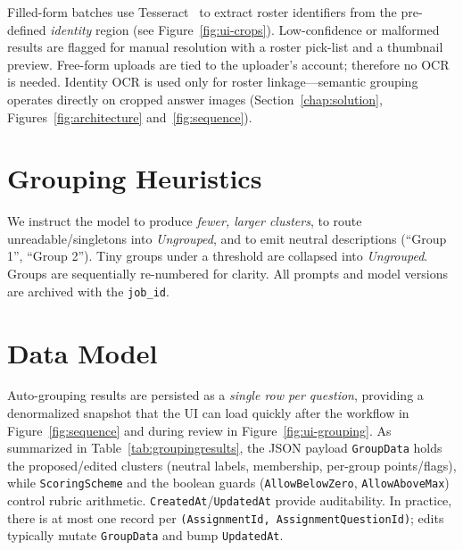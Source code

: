 \documentclass[ms,twoside,print]{nuthesis}
\begin{document}
Filled-form batches use Tesseract~\cite{tesseract} to extract roster identifiers from the pre-defined \emph{identity} region (see Figure~\ref{fig:ui-crops}). Low-confidence or malformed results are flagged for manual resolution with a roster pick-list and a thumbnail preview. Free-form uploads are tied to the uploader’s account; therefore no OCR is needed. Identity OCR is used only for roster linkage—semantic grouping operates directly on cropped answer images (Section~\ref{chap:solution}, Figures~\ref{fig:architecture} and~\ref{fig:sequence}).

\section{Grouping Heuristics}
We instruct the model to produce \emph{fewer, larger clusters}, to route unreadable/singletons into \emph{Ungrouped}, and to emit neutral descriptions (\enquote{Group 1}, \enquote{Group 2}). Tiny groups under a threshold are collapsed into \emph{Ungrouped}. Groups are sequentially re-numbered for clarity. All prompts and model versions are archived with the \texttt{job\_id}.

\section{Data Model}
Auto-grouping results are persisted as a \emph{single row per question}, providing a denormalized snapshot that the UI can load quickly after the workflow in Figure~\ref{fig:sequence} and during review in Figure~\ref{fig:ui-grouping}. As summarized in Table~\ref{tab:groupingresults}, the JSON payload \texttt{GroupData} holds the proposed/edited clusters (neutral labels, membership, per-group points/flags), while \texttt{ScoringScheme} and the boolean guards (\texttt{AllowBelowZero}, \texttt{AllowAboveMax}) control rubric arithmetic. \texttt{CreatedAt}/\texttt{UpdatedAt} provide auditability. In practice, there is at most one record per \texttt{(AssignmentId, AssignmentQuestionId)}; edits typically mutate \texttt{GroupData} and bump \texttt{UpdatedAt}.
\end{document}
